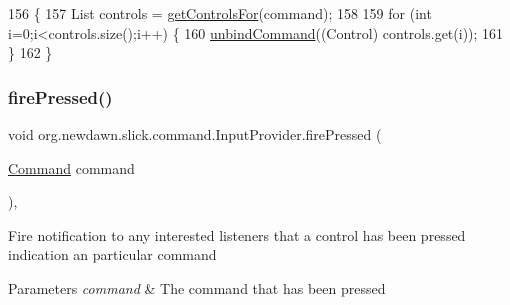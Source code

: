 \begin{DoxyCode}
156                                               \{
157         List controls = \mbox{\hyperlink{classorg_1_1newdawn_1_1slick_1_1command_1_1_input_provider_ab2b7def0bd26b6292ac45b4ca253e43a}{getControlsFor}}(command);
158         
159         \textcolor{keywordflow}{for} (\textcolor{keywordtype}{int} i=0;i<controls.size();i++) \{
160             \mbox{\hyperlink{classorg_1_1newdawn_1_1slick_1_1command_1_1_input_provider_a4c5a3cae6a8b19d53b8a3419d856d449}{unbindCommand}}((Control) controls.get(i));
161         \}
162     \}
\end{DoxyCode}
\mbox{\label{classorg_1_1newdawn_1_1slick_1_1command_1_1_input_provider_a82cd36086b5780ccce446717e8075e96}} 
\subsubsection{\texorpdfstring{fire\+Pressed()}{firePressed()}}
{\footnotesize\ttfamily void org.\+newdawn.\+slick.\+command.\+Input\+Provider.\+fire\+Pressed (\begin{DoxyParamCaption}\item[{\mbox{\hyperlink{interfaceorg_1_1newdawn_1_1slick_1_1command_1_1_command}{Command}}}]{command }\end{DoxyParamCaption})\hspace{0.3cm}{\ttfamily [inline]}, {\ttfamily [protected]}}

Fire notification to any interested listeners that a control has been pressed indication an particular command


\begin{DoxyParams}{Parameters}
{\em command} & The command that has been pressed \\
\hline
\end{DoxyParams}

